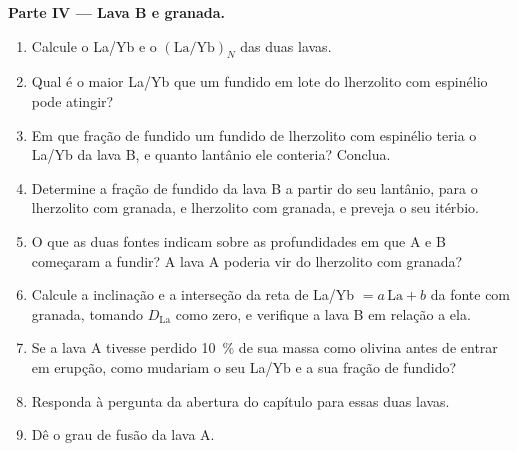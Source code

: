 \begin{problem}
\medskip\noindent\textbf{Parte IV --- Lava B e granada.}
\begin{enumerate}[resume]
\item Calcule o La/Yb e o $(\mathrm{La}/\mathrm{Yb})_N$ das duas lavas.
\item Qual é o maior La/Yb que um fundido em lote do lherzolito com espinélio pode
atingir?
\item Em que fração de fundido um fundido de lherzolito com espinélio teria o La/Yb da
lava B, e quanto lantânio ele conteria? Conclua.
\item Determine a fração de fundido da lava B a partir do seu lantânio, para o lherzolito com granada, e
lherzolito com granada, e preveja o seu itérbio.
\item O que as duas fontes indicam sobre as profundidades em que A e B começaram a
fundir? A lava A poderia vir do lherzolito com granada?
\item Calcule a inclinação e a interseção da reta de  La/Yb $= a\,
\mathrm{La} + b$ da fonte com granada, tomando $D_{\mathrm{La}}$ como zero,
e verifique a lava B em relação a ela.
\item Se a lava A tivesse perdido \qty{10}{\percent} de sua massa como olivina antes
de entrar em erupção, como mudariam o seu La/Yb e a sua fração de fundido?
\item Responda à pergunta da abertura do capítulo para essas duas lavas.
\item Dê o grau de fusão da lava A.
\end{enumerate}
\end{problem}
